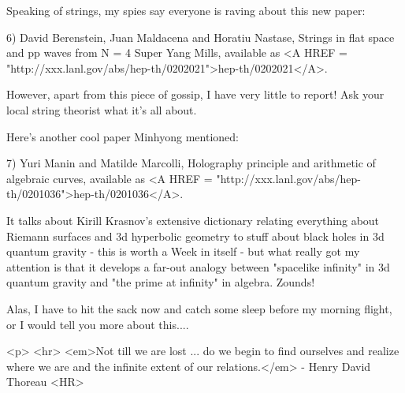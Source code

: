 Speaking of strings, my spies say everyone is raving about this
new paper:

6) David Berenstein, Juan Maldacena and Horatiu Nastase, Strings
in flat space and pp waves from N = 4 Super Yang Mills, available as
<A HREF = "http://xxx.lanl.gov/abs/hep-th/0202021">hep-th/0202021</A>.

However, apart from this piece of gossip, I have very little to
report!  Ask your local string theorist what it's all about.

Here's another cool paper Minhyong mentioned:

7) Yuri Manin and Matilde Marcolli, Holography principle and arithmetic 
of algebraic curves, available as <A HREF = "http://xxx.lanl.gov/abs/hep-th/0201036">hep-th/0201036</A>.

It talks about Kirill Krasnov's extensive dictionary relating 
everything about Riemann surfaces and 3d hyperbolic geometry
to stuff about black holes in 3d quantum gravity - this is worth 
a Week in itself - but what really got my attention is that it
develops a far-out analogy between "spacelike infinity" in 3d 
quantum gravity and "the prime at infinity" in algebra.  Zounds!

Alas, I have to hit the sack now and catch some sleep before my
morning flight, or I would tell you more about this....


<p> <hr>
<em>Not till we are lost ... do we begin to find ourselves
and realize where we are and the infinite extent of our
relations.</em> - Henry David Thoreau
<HR>



